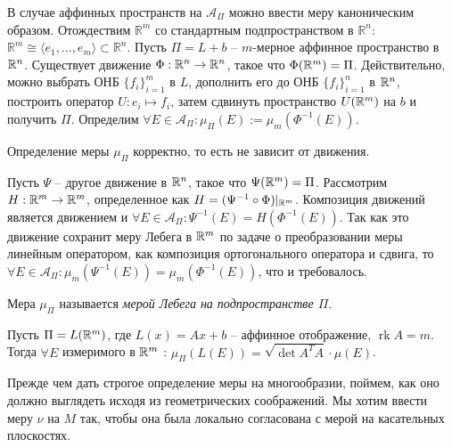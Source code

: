 \begin{note} 
	В случае аффинных пространств на $\mathcal{A}_{\Pi}$ можно ввести меру каноническим образом.
	Отождествим $\mathbb{R}^m$ со стандартным подпространством в $\mathbb{R}^n$: $\mathbb{R}^m \cong \langle e_1, \dotsc, e_m \rangle \subset \mathbb{R}^n$.
	Пусть $\Pi = L + b$ -- $m$-мерное аффинное пространство в $\mathbb{R}^n$. Существует движение $\Phi : \mathbb{R}^n \to \mathbb{R}^n$, такое что $\Phi(\mathbb{R}^m) = \Pi$.
	Действительно, можно выбрать ОНБ $\{f_i\}_{i=1}^m$ в $L$, дополнить его до ОНБ $\{f_i\}_{i=1}^n$ в $\mathbb{R}^n$, построить оператор $U : e_i \mapsto f_i$, затем сдвинуть пространство $U(\mathbb{R}^m)$ на $b$ и получить $\Pi$.
	Определим $\forall E \in \mathcal{A}_{\Pi} : \mu_{\Pi}(E) := \mu_m(\Phi^{-1}(E))$.
\end{note}

\begin{proposition}
	Определение меры $\mu_{\Pi}$ корректно, то есть не зависит от движения.
\end{proposition}

\begin{myproof}
	Пусть $\Psi$ -- другое движение в $\mathbb{R}^n$, такое что $\Psi(\mathbb{R}^m) = \Pi$.
	Рассмотрим $H : \mathbb{R}^m \to \mathbb{R}^m$, определенное как $H = (\Psi^{-1} \circ \Phi)|_{\mathbb{R}^m}$. 
	Композиция движений является движением и $\forall E \in \mathcal{A}_{\Pi} : \Psi^{-1}(E) = H(\Phi^{-1}(E))$.
	Так как это движение сохранит меру Лебега в $\mathbb{R}^m$ по задаче о преобразовании меры линейным оператором, как композиция ортогонального оператора и сдвига, то 
	$\forall E \in \mathcal{A}_{\Pi} : \mu_m(\Psi^{-1}(E)) = \mu_m(\Phi^{-1}(E))$, что и требовалось.
\end{myproof}

\vspace{5pt}

Мера $\mu_{\Pi}$ называется \textit{мерой Лебега на подпространстве $\Pi$}.

\begin{lemma}[б/д]
	Пусть $\Pi = L(\mathbb{R}^m)$, где $L(x) = Ax + b$ -- аффинное отображение, $\operatorname{rk} A = m$. 
	Тогда $\forall E$ измеримого в $\mathbb{R}^m$ : $\mu_{\Pi}(L(E)) = \sqrt{\det A^T A} \cdot \mu(E)$.
\end{lemma}

Прежде чем дать строгое определение меры на многообразии, поймем, как оно должно выглядеть исходя из геометрических соображений. 
Мы хотим ввести меру $\nu$ на $M$ так, чтобы она была локально согласована с мерой на касательных плоскостях.

